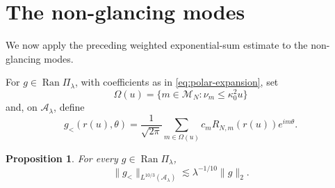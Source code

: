 \documentclass[10pt,a4paper]{amsart}
\newtheorem{proposition}[theorem]{Proposition}
\numberwithin{equation}{section}
\newcommand{\norm}[1]{\lVert #1\rVert}
\begin{document}
\section{The non-glancing  modes}\label{sec:non-glancing}

We now apply the preceding weighted exponential-sum estimate to the non-glancing modes. 

For \(g\in\operatorname{Ran}\Pi_\lambda\), with coefficients as in
\eqref{eq:polar-expansion}, set
\[
 \Omega(u)=\{m\in\mathcal M_N:\nu_m\le\kappa_0^2u\}
\]
and, on \(\mathcal A_\lambda\), define
\begin{equation}\label{eq:ng-definition}
 g_{<}(r(u),\theta)
 =\frac1{\sqrt{2\pi}}\sum_{m\in\Omega(u)}
 c_mR_{N,m}(r(u))e^{im\theta}.
\end{equation}

\begin{proposition}\label{prop:below-threshold}
For every \(g\in\operatorname{Ran}\Pi_\lambda\),
\[
 \norm{g_{<}}_{L^{10/3}(\mathcal A_\lambda)}
 \lesssim\lambda^{-1/10}\norm g_2.
\]
\end{proposition}
\end{document}
